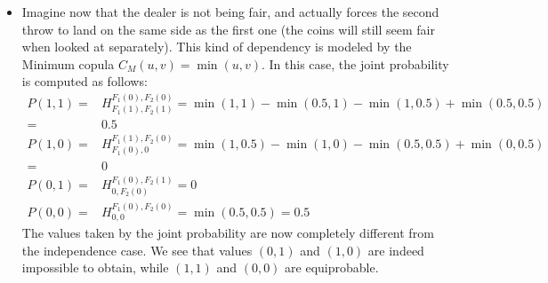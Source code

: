 \begin{example}
\begin{itemize}
        \item Imagine now that the dealer is not being fair, and actually forces the second throw to land on the same side as the first one (the coins will still seem fair when looked at separately). This kind of dependency is modeled by the Minimum copula $C_M(u,v)=\min(u,v)$. In this case, the joint probability is computed as follows: 
		\begin{align*}
            P(1,1) =& H_{F_1(1), F_2(1)}^{F_1(0), F_2(0)} = \min(1,1) - \min(0.5,1) - \min(1,0.5) + \min(0.5,0.5)\\
            =& 0.5\\
            P(1,0) =& H_{F_1(0), 0}^{F_1(1), F_2(0)} =\min(1,0.5) - \min(1, 0) - \min(0.5,0.5) + \min(0,0.5)\\
            =& 0\\
            P(0,1) =& H_{0, F_2(0)}^{F_1(0), F_2(1)} = 0 \\
            P(0,0) =& H_{0, 0}^{F_1(0), F_2(0)} = \min(0.5,0.5)=0.5
        \end{align*}
        The values taken by the joint probability are now completely different from the independence case. We see that values $(0,1)$ and $(1,0)$ are indeed impossible to obtain, while $(1,1)$ and $(0,0)$ are equiprobable.
        

\end{itemize}
\end{example}
